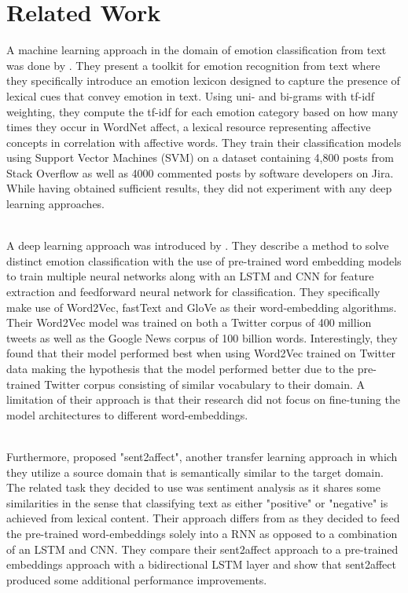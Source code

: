 \section{Related Work}

A machine learning approach in the domain of emotion classification from text was done by \citep{EmoTxt}. They present a toolkit for emotion recognition from text where they specifically introduce an emotion lexicon designed to capture the presence of lexical cues that convey emotion in text. Using uni- and bi-grams with tf-idf weighting, they compute the tf-idf for each emotion category based on how many times they occur in WordNet affect, a lexical resource representing affective concepts in correlation with affective words. They train their classification models using Support Vector Machines (SVM) on a dataset containing 4,800 posts from Stack Overflow as well as 4000 commented posts by software developers on Jira. While having obtained sufficient results, they did not experiment with any deep learning approaches. 

\noindent
\\ A deep learning approach was introduced by \citep{senarath-thayasivam-2018-datasearch}. They describe a method to solve distinct emotion classification with the use of pre-trained word embedding models to train multiple neural networks along with an LSTM and CNN for feature extraction and feedforward neural network for classification. They specifically make use of Word2Vec, fastText and GloVe as their word-embedding algorithms. Their Word2Vec model was trained on both a Twitter corpus of 400 million tweets as well as the  Google News corpus of 100 billion words. Interestingly, they found that their model performed best when using Word2Vec trained on Twitter data making the hypothesis that the model performed better due to the pre-trained Twitter corpus consisting of similar vocabulary to their domain. A limitation of their approach is that their research did not focus on fine-tuning the model architectures to different word-embeddings. 

\noindent
\\ Furthermore, \citep{dl-affective} proposed "sent2affect", another transfer learning approach in which they utilize a source domain that is semantically similar to the target domain. The related task they decided to use was sentiment analysis as it shares some similarities in the sense that classifying text as either "positive" or "negative" is achieved from lexical content. Their approach differs from \citep{senarath-thayasivam-2018-datasearch} as they decided to feed the pre-trained word-embeddings solely into a RNN as opposed to a combination of an LSTM and CNN. They compare their sent2affect approach to a pre-trained embeddings approach with a bidirectional LSTM layer and show that sent2affect produced some additional performance improvements. 


